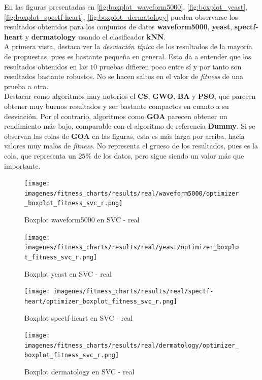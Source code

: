 En las figuras presentadas en \ref{fig:boxplot_waveform5000}, \ref{fig:boxplot_yeast}, \ref{fig:boxplot_spectf-heart}, \ref{fig:boxplot_dermatology} pueden observarse los resultados obtenidos para los conjuntos de datos \textbf{waveform5000}, \textbf{yeast}, \textbf{spectf-heart} y \textbf{dermatology} usando el clasificador \textbf{kNN}. \\[6pt]
A primera vista, destaca ver la \textit{desviación típica} de los resultados de la mayoría de propuestas, pues es bastante pequeña en general. Esto da a entender que los resultados obtenidos en las $10$ pruebas difieren poco entre sí y por tanto son resultados bastante robustos. No se hacen saltos en el valor de \textit{fitness} de una prueba a otra.\\[6pt]
Destacar como algoritmos muy notorios el \textbf{CS}, \textbf{GWO}, \textbf{BA} y \textbf{PSO}, que parecen obtener muy buenos resultados y ser bastante compactos en cuanto a su desviación. Por el contrario, algoritmos como \textbf{GOA} parecen obtener un rendimiento más bajo, comparable con el algoritmo de referencia \textbf{Dummy}. Si se observan las colas de \textbf{GOA} en las figuras, esta es más larga por arriba, hacia valores muy malos de \textit{fitness}. No representa el grueso de los resultados, pues es la cola, que representa un $25\%$ de los datos, pero sigue siendo un valor más que importante.\\[6pt]

\begin{figure}[htp]
    \centering
    \texttt{[image: imagenes/fitness\_charts/results/real/waveform5000/optimizer\_boxplot\_fitness\_svc\_r.png]}
    \caption{Boxplot waveform5000 en SVC - real}
    \label{fig:boxplot_waveform5000svc}
\end{figure}

\begin{figure}[htp]
    \centering
    \texttt{[image: imagenes/fitness\_charts/results/real/yeast/optimizer\_boxplot\_fitness\_svc\_r.png]}
    \caption{Boxplot yeast en SVC - real}
    \label{fig:boxplot_yeastsvc}
\end{figure}

\begin{figure}[htp]
    \centering
    \texttt{[image: imagenes/fitness\_charts/results/real/spectf-heart/optimizer\_boxplot\_fitness\_svc\_r.png]}
    \caption{Boxplot spectf-heart en SVC - real}
    \label{fig:boxplot_spectf-heartsvc}
\end{figure}

\begin{figure}[htp]
    \centering
    \texttt{[image: imagenes/fitness\_charts/results/real/dermatology/optimizer\_boxplot\_fitness\_svc\_r.png]}
    \caption{Boxplot dermatology en SVC - real}
    \label{fig:boxplot_dermatologysvc}
\end{figure}

